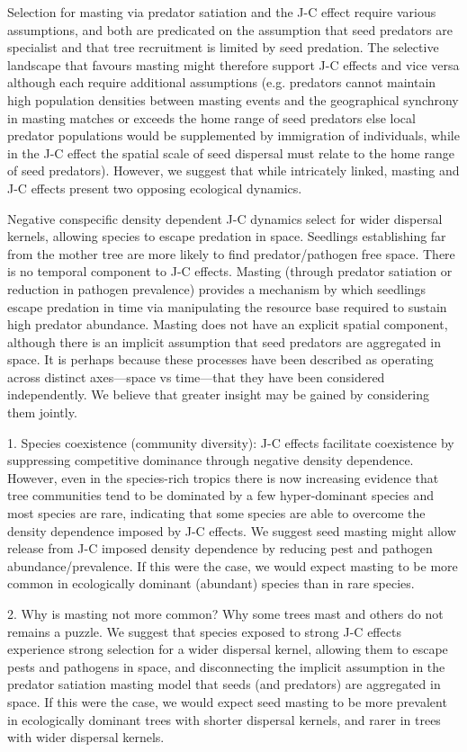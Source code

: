 \documentclass[11pt]{article}
\begin{document}
Selection for masting via predator satiation and the J-C effect require various assumptions, and both are predicated on the assumption that seed predators are specialist and that tree recruitment is limited by seed predation. The selective landscape that favours masting might therefore support J-C effects and vice versa although each require additional assumptions (e.g. predators cannot maintain high population densities between masting events and the geographical synchrony in masting matches or exceeds the home range of seed predators else local predator populations would be supplemented by immigration of individuals, while in the J-C effect the spatial scale of seed dispersal must relate to the home range of seed predators). However, we suggest that while intricately linked, masting and J-C effects present two opposing ecological dynamics.

Negative conspecific density dependent J-C dynamics select for wider dispersal kernels, allowing species to escape predation in space. Seedlings establishing far from the mother tree are more likely to find predator/pathogen free space. There is no temporal component to J-C effects. Masting (through predator satiation or reduction in pathogen prevalence) provides a mechanism by which seedlings escape predation in time via manipulating the resource base required to sustain high predator abundance. Masting does not have an explicit spatial component, although there is an implicit assumption that seed predators are aggregated in space. It is perhaps because these processes have been described as operating across distinct axes—space vs time—that they have been considered independently. We believe that greater insight may be gained by considering them jointly.

1. Species coexistence (community diversity): J-C effects facilitate coexistence by suppressing competitive dominance through negative density dependence. However, even in the species-rich tropics there is now increasing evidence that tree communities tend to be dominated by a few hyper-dominant species and most species are rare, indicating that some species are able to overcome the density dependence imposed by J-C effects. We suggest seed masting might allow release from J-C imposed density dependence by reducing pest and pathogen abundance/prevalence. If this were the case, we would expect masting to be more common in ecologically dominant (abundant) species than in rare species.

2. Why is masting not more common? Why some trees mast and others do not remains a puzzle. We suggest that species exposed to strong J-C effects experience strong selection for a wider dispersal kernel, allowing them to escape pests and pathogens in space, and disconnecting the implicit assumption in the predator satiation masting model that seeds (and predators) are aggregated in space. If this were the case, we would expect seed masting to be more prevalent in ecologically dominant trees with shorter dispersal kernels, and rarer in trees with wider dispersal kernels.
\end{document}
